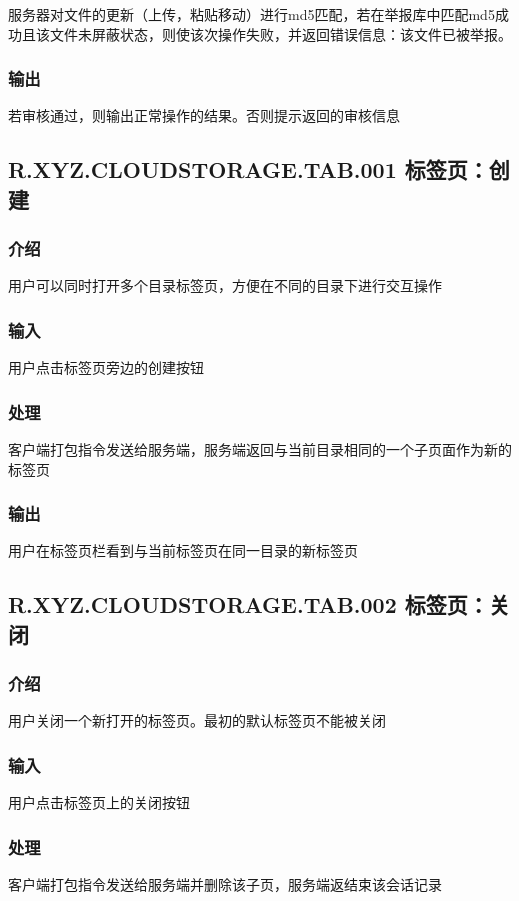 服务器对文件的更新（上传，粘贴移动）进行md5匹配，若在举报库中匹配md5成功且该文件未屏蔽状态，则使该次操作失败，并返回错误信息：该文件已被举报。

\subsubsection{输出} 
若审核通过，则输出正常操作的结果。否则提示返回的审核信息

\subsection{R.XYZ.CLOUDSTORAGE.TAB.001 标签页：创建}

\subsubsection{介绍}
用户可以同时打开多个目录标签页，方便在不同的目录下进行交互操作
\subsubsection{输入} 
用户点击标签页旁边的创建按钮
\subsubsection{处理} 
客户端打包指令发送给服务端，服务端返回与当前目录相同的一个子页面作为新的标签页
\subsubsection{输出}
用户在标签页栏看到与当前标签页在同一目录的新标签页

\subsection{R.XYZ.CLOUDSTORAGE.TAB.002 标签页：关闭}

\subsubsection{介绍}
用户关闭一个新打开的标签页。最初的默认标签页不能被关闭
\subsubsection{输入} 
用户点击标签页上的关闭按钮
\subsubsection{处理} 
客户端打包指令发送给服务端并删除该子页，服务端返结束该会话记录
